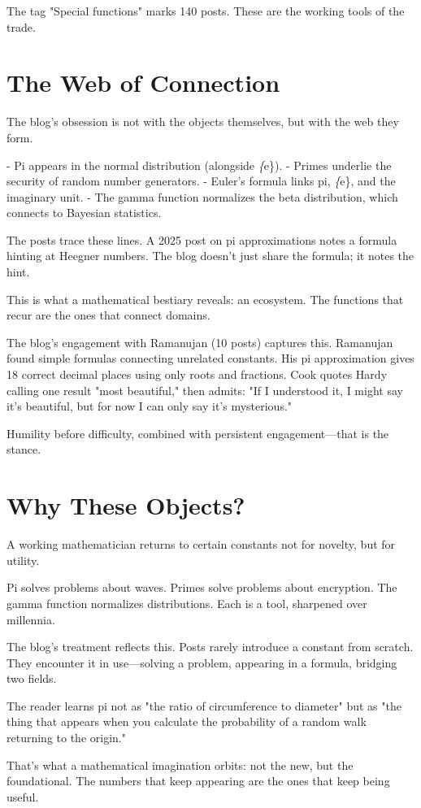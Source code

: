 The tag "Special functions" marks 140 posts. These are the working tools of the trade.


\bigskip

\section*{The Web of Connection}

The blog's obsession is not with the objects themselves, but with the web they form.

- Pi appears in the normal distribution (alongside \textit\{e\}).
- Primes underlie the security of random number generators.
- Euler's formula links pi, \textit\{e\}, and the imaginary unit.
- The gamma function normalizes the beta distribution, which connects to Bayesian statistics.

The posts trace these lines. A 2025 post on pi approximations notes a formula hinting at Heegner numbers. The blog doesn't just share the formula; it notes the hint.

This is what a mathematical bestiary reveals: an ecosystem. The functions that recur are the ones that connect domains.

The blog's engagement with Ramanujan (10 posts) captures this. Ramanujan found simple formulas connecting unrelated constants. His pi approximation gives 18 correct decimal places using only roots and fractions. Cook quotes Hardy calling one result "most beautiful," then admits: "If I understood it, I might say it's beautiful, but for now I can only say it's mysterious."

Humility before difficulty, combined with persistent engagement—that is the stance.

\bigskip

\section*{Why These Objects?}

A working mathematician returns to certain constants not for novelty, but for utility.

Pi solves problems about waves. Primes solve problems about encryption. The gamma function normalizes distributions. Each is a tool, sharpened over millennia.

The blog's treatment reflects this. Posts rarely introduce a constant from scratch. They encounter it in use—solving a problem, appearing in a formula, bridging two fields.

The reader learns pi not as "the ratio of circumference to diameter" but as "the thing that appears when you calculate the probability of a random walk returning to the origin."

That's what a mathematical imagination orbits: not the new, but the foundational. The numbers that keep appearing are the ones that keep being useful.
